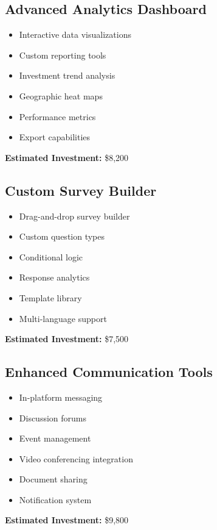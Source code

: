 \documentclass[11pt,a4paper]{article}
\begin{document}
\subsection{Advanced Analytics Dashboard}
\begin{tcolorbox}[colback=white,colframe=accentPurple!20,title=Planned Features]
\begin{itemize}[leftmargin=*]
    \item Interactive data visualizations
    \item Custom reporting tools
    \item Investment trend analysis
    \item Geographic heat maps
    \item Performance metrics
    \item Export capabilities
\end{itemize}
\textbf{Estimated Investment:} \$8,200
\end{tcolorbox}

\subsection{Custom Survey Builder}
\begin{tcolorbox}[colback=white,colframe=accentPurple!20,title=Planned Features]
\begin{itemize}[leftmargin=*]
    \item Drag-and-drop survey builder
    \item Custom question types
    \item Conditional logic
    \item Response analytics
    \item Template library
    \item Multi-language support
\end{itemize}
\textbf{Estimated Investment:} \$7,500
\end{tcolorbox}

\subsection{Enhanced Communication Tools}
\begin{tcolorbox}[colback=white,colframe=accentPurple!20,title=Planned Features]
\begin{itemize}[leftmargin=*]
    \item In-platform messaging
    \item Discussion forums
    \item Event management
    \item Video conferencing integration
    \item Document sharing
    \item Notification system
\end{itemize}
\textbf{Estimated Investment:} \$9,800
\end{tcolorbox}
\end{document}
